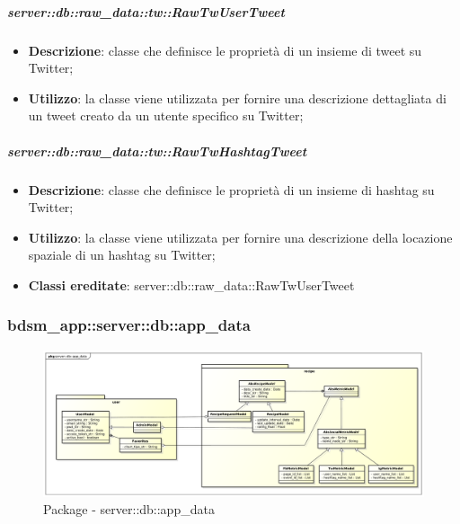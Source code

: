 		\subparagraph{server::db::raw\_data::tw::RawTwUserTweet} %
		\label{subp:server_db_raw_data_tw_rawtwusertweet}
			\begin{itemize}
				\item \textbf{Descrizione}: classe che definisce le proprietà di un insieme di tweet su Twitter;
				\item \textbf{Utilizzo}: la classe viene utilizzata per fornire una descrizione dettagliata di un tweet creato da un utente specifico su Twitter;
			\end{itemize}


		\subparagraph{server::db::raw\_data::tw::RawTwHashtagTweet} %
		\label{subp:server_db_raw_data_tw_rawtwhashtagtweet}
			\begin{itemize}
				\item \textbf{Descrizione}: classe che definisce le proprietà di un insieme di hashtag su Twitter;
				\item \textbf{Utilizzo}: la classe viene utilizzata per fornire una descrizione della locazione spaziale di un hashtag su Twitter;
				\item \textbf{Classi ereditate}: server::db::raw\_data::RawTwUserTweet
			\end{itemize}











\subsubsection{bdsm\_app::server::db::app\_data} %
\label{ssub:bdsm_app_server_app_data}


	\begin{figure}[htbp]
		\centering
		\centerline{\includegraphics[scale=0.38]{./images/server/app_data.pdf}}
		\caption{Package - server::db::app\_data}
	\end{figure}



